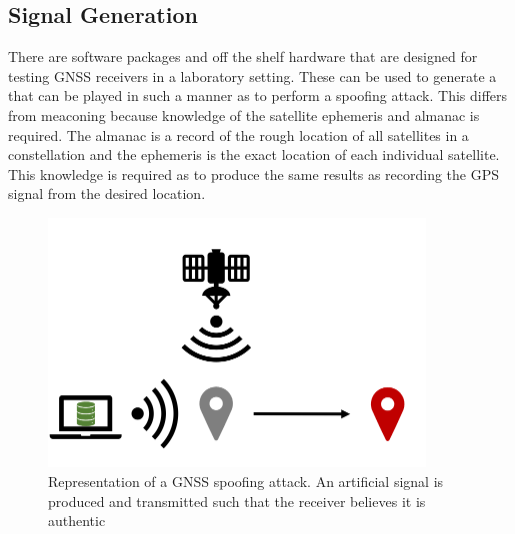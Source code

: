\subsection{Signal Generation}
There are software packages and off the shelf hardware that are designed for testing GNSS receivers in a laboratory setting. These can be used to generate a that can be
played in such a manner as to perform a spoofing attack. This differs from meaconing because knowledge of the satellite ephemeris and almanac is required. The almanac is
a record of the rough location of all satellites in a constellation and the ephemeris is the exact location of each individual satellite. This knowledge is required as to
produce the same results as recording the GPS signal from the desired location.

\begin{figure}[h]
    \begin{centering}
        \includegraphics[width=10cm, keepaspectratio]{Figures/Spoofing.png}
        \caption{Representation of a GNSS spoofing attack. An artificial signal is produced and transmitted such that the receiver believes it is authentic}
    \label{fig:spoofing cartoon}
    \end{centering}
\end{figure}


